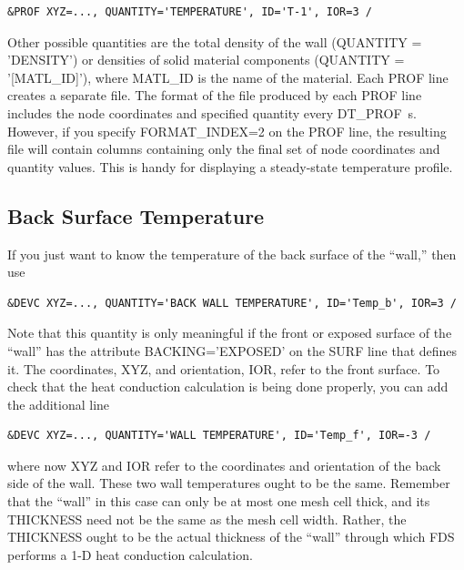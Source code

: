 \documentclass[11pt]{book}
\begin{document}
\begin{lstlisting}
&PROF XYZ=..., QUANTITY='TEMPERATURE', ID='T-1', IOR=3 /
\end{lstlisting}

\noindent
Other possible quantities are the total density of the wall ({\ct QUANTITY = 'DENSITY'}) or densities of solid material components
({\ct QUANTITY = '[MATL\_ID]'}), where {\ct MATL\_ID} is the name of the material. Each {\ct PROF} line creates a separate file. The format of the file produced by each {\ct PROF} line includes the node coordinates and specified quantity every {\ct DT\_PROF}~s. However, if you specify {\ct FORMAT\_INDEX=2} on the {\ct PROF} line, the resulting file will contain columns containing only the final set of node coordinates and quantity values. This is handy for displaying a steady-state temperature profile.

\subsection{Back Surface Temperature}
\label{info:BACK}

If you just want to know the temperature of the back surface of the ``wall,'' then use

\begin{lstlisting}
&DEVC XYZ=..., QUANTITY='BACK WALL TEMPERATURE', ID='Temp_b', IOR=3 /
\end{lstlisting}

\noindent
Note that this quantity is only meaningful if the front or exposed surface of the ``wall'' has the attribute {\ct BACKING='EXPOSED'} on the {\ct SURF} line that defines it. The coordinates, {\ct XYZ}, and orientation, {\ct IOR}, refer to the front surface. To check that the heat conduction calculation is being done properly, you can add the additional line

\begin{lstlisting}
&DEVC XYZ=..., QUANTITY='WALL TEMPERATURE', ID='Temp_f', IOR=-3 /
\end{lstlisting}

\noindent
where now {\ct XYZ} and {\ct IOR} refer to the coordinates and orientation of the back side of the wall. These two wall temperatures ought to be
the same. Remember that the ``wall'' in this case can only be at most one mesh cell thick, and its {\ct THICKNESS} need not be the same as the
mesh cell width. Rather, the {\ct THICKNESS} ought to be the actual thickness of the ``wall'' through which FDS performs a 1-D heat conduction
calculation.
\end{document}
